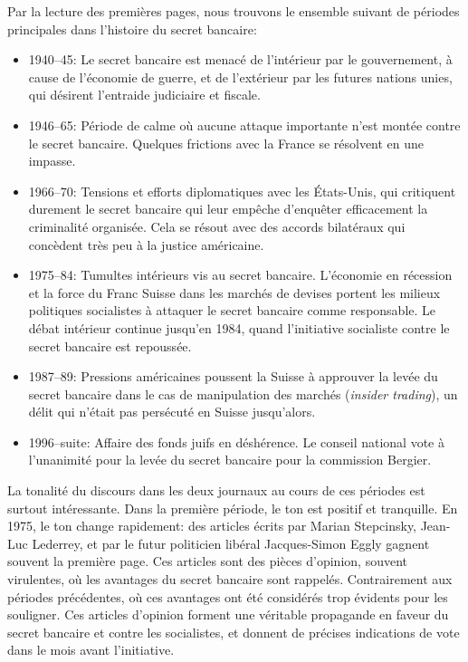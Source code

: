 \documentclass[11pt]{article}
\begin{document}
Par la lecture des premières pages, nous trouvons le ensemble suivant de
périodes principales dans l'histoire du secret bancaire:

\begin{itemize}
\item
  1940--45: Le secret bancaire est menacé de l'intérieur par le
  gouvernement, à cause de l'économie de guerre, et de l'extérieur par
  les futures nations unies, qui désirent l'entraide judiciaire et
  fiscale.
\item
  1946--65: Période de calme où aucune attaque importante n'est montée
  contre le secret bancaire. Quelques frictions avec la France se
  résolvent en une impasse.
\item
  1966--70: Tensions et efforts diplomatiques avec les États-Unis, qui
  critiquent durement le secret bancaire qui leur empêche d'enquêter
  efficacement la criminalité organisée. Cela se résout avec des accords
  bilatéraux qui concèdent très peu à la justice américaine.
\item
  1975--84: Tumultes intérieurs vis au secret bancaire. L'économie en
  récession et la force du Franc Suisse dans les marchés de devises
  portent les milieux politiques socialistes à attaquer le secret
  bancaire comme responsable. Le débat intérieur continue jusqu'en 1984,
  quand l'initiative socialiste contre le secret bancaire est repoussée.
\item
  1987--89: Pressions américaines poussent la Suisse à approuver la
  levée du secret bancaire dans le cas de manipulation des marchés
  (\emph{insider trading}), un délit qui n'était pas persécuté en Suisse
  jusqu'alors.
\item
  1996--suite: Affaire des fonds juifs en déshérence. Le conseil
  national vote à l'unanimité pour la levée du secret bancaire pour la
  commission Bergier.
\end{itemize}

La tonalité du discours dans les deux journaux au cours de ces périodes
est surtout intéressante. Dans la première période, le ton est positif
et tranquille. En 1975, le ton change rapidement: des articles écrits
par Marian Stepcinsky, Jean-Luc Lederrey, et par le futur politicien
libéral Jacques-Simon Eggly gagnent souvent la première page. Ces
articles sont des pièces d'opinion, souvent virulentes, où les avantages
du secret bancaire sont rappelés. Contrairement aux périodes
précédentes, où ces avantages ont été considérés trop évidents pour les
souligner. Ces articles d'opinion forment une véritable propagande en
faveur du secret bancaire et contre les socialistes, et donnent de
précises indications de vote dans le mois avant l'initiative.
\end{document}
